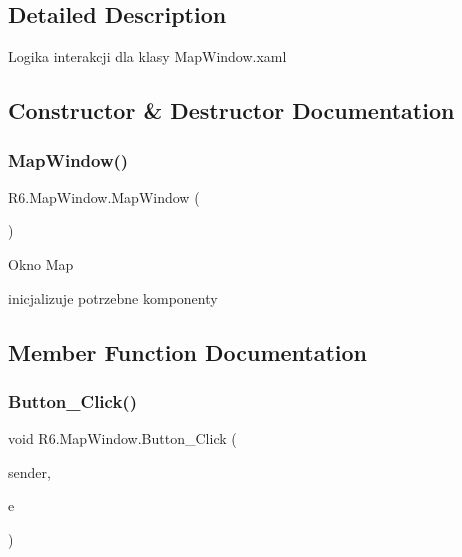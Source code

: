 \subsection{Detailed Description}
Logika interakcji dla klasy Map\+Window.\+xaml 



\subsection{Constructor \& Destructor Documentation}
\mbox{\label{class_r6_1_1_map_window_aada661b10260b40a63eb9885ae4e7d07}} 
\subsubsection{\texorpdfstring{MapWindow()}{MapWindow()}}
{\footnotesize\ttfamily R6.\+Map\+Window.\+Map\+Window (\begin{DoxyParamCaption}{ }\end{DoxyParamCaption})}



Okno Map 

inicjalizuje potrzebne komponenty 

\subsection{Member Function Documentation}
\mbox{\label{class_r6_1_1_map_window_a976927b4bcb1d1bb2ff8e9967b0f61ff}} 
\subsubsection{\texorpdfstring{Button\_Click()}{Button\_Click()}}
{\footnotesize\ttfamily void R6.\+Map\+Window.\+Button\+\_\+\+Click (\begin{DoxyParamCaption}\item[{object}]{sender,  }\item[{Routed\+Event\+Args}]{e }\end{DoxyParamCaption})\hspace{0.3cm}{\ttfamily [private]}}




